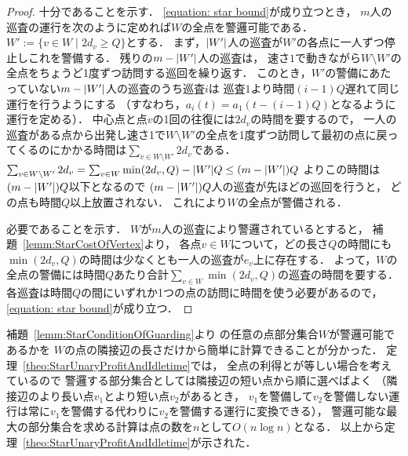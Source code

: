 \begin{proof}
  十分であることを示す．
  \eqref{equation: star bound}が成り立つとき，
  $m$人の巡査の運行を次のように定めれば$W$の全点を警邏可能である．
  $W' := \{ v \in W \mid 2d_v \geq Q \}$とする．
  まず，$\lvert{W'}\rvert$人の巡査が$W'$の各点に一人ずつ停止しこれを警備する．
  残りの$m - \lvert{W'}\rvert$人の巡査は，
  速さ$1$で動きながら$W \setminus W'$の全点をちょうど1度ずつ訪問する巡回を繰り返す．
  このとき，$W'$の警備にあたっていない$m - \lvert{W'}\rvert$人の巡査のうち巡査$i$は
  巡査$1$より時間$(i - 1)Q$遅れて同じ運行を行うようにする
  （すなわち，$a_i(t) = a_1(t - (i - 1)Q)$となるように運行を定める）．
  中心点と点$v$の1回の往復には$2d_v$の時間を要するので，
  一人の巡査がある点から出発し速さ1で$W \setminus W'$の全点を1度ずつ訪問して最初の点に戻ってくるのにかかる時間は$\sum_{v \in W \setminus W'} 2d_v$である．
  $\sum_{v \in W \setminus W'} 2d_v
  = \sum_{v \in W} \min(2d_v, Q) - \lvert{W'}\rvert Q
  \leq (m - \lvert{W'}\rvert)Q$
  よりこの時間は$(m - \lvert{W'}\rvert)Q$以下となるので
  $(m - \lvert{W'}\rvert)Q$人の巡査が先ほどの巡回を行うと，
  どの点も時間$Q$以上放置されない．
  これにより$W$の全点が警備される．

  必要であることを示す．
  $W$が$m$人の巡査により警邏されているとすると，
  補題~\ref{lemm:StarCostOfVertex}より，
  各点$v \in W$について，どの長さ$Q$の時間にも
  $\min(2d_v, Q)$の時間は少なくとも一人の巡査が$e_v$上に存在する．
  よって，$W$の全点の警備には時間$Q$あたり合計$\sum_{v \in W} \min(2d_v, Q)$の巡査の時間を要する．
  各巡査は時間$Q$の間にいずれか1つの点の訪問に時間を使う必要があるので，
  \eqref{equation: star bound}が成り立つ．
\end{proof}


補題~\ref{lemm:StarConditionOfGuarding}より
{\graphStar}の任意の点部分集合$W$が警邏可能であるかを
$W$の点の隣接辺の長さだけから簡単に計算できることが分かった．
定理~\ref{theo:StarUnaryProfitAndIdletime}では，
全点の利得と{\maxIdletime}が等しい場合を考えているので
警邏する部分集合としては隣接辺の短い点から順に選べばよく
（隣接辺のより長い点$v_1$とより短い点$v_2$があるとき，
$v_1$を警備して$v_2$を警備しない運行は常に$v_1$を警備する代わりに$v_2$を警備する運行に変換できる），
警邏可能な最大の部分集合を求める計算は点の数を$n$として$O(n \log n)$となる．
以上から定理~\ref{theo:StarUnaryProfitAndIdletime}が示された．
